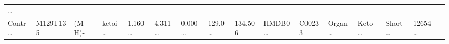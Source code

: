 \documentclass[
]{article}
\begin{document}
\begin{longtable}[]{@{}llllllllllllllll@{}}
\begin{minipage}[t]{0.02\columnwidth}
\ldots{}\strut
\end{minipage}\tabularnewline
\begin{minipage}[t]{0.04\columnwidth}\raggedright
Contr\ldots{}\strut
\end{minipage} & \begin{minipage}[t]{0.04\columnwidth}\raggedright
M129T135\strut
\end{minipage} & \begin{minipage}[t]{0.04\columnwidth}\raggedright
(M-H)-\strut
\end{minipage} & \begin{minipage}[t]{0.04\columnwidth}\raggedright
ketoi\ldots{}\strut
\end{minipage} & \begin{minipage}[t]{0.04\columnwidth}\raggedright
1.160\ldots{}\strut
\end{minipage} & \begin{minipage}[t]{0.04\columnwidth}\raggedright
4.311\ldots{}\strut
\end{minipage} & \begin{minipage}[t]{0.04\columnwidth}\raggedright
0.000\ldots{}\strut
\end{minipage} & \begin{minipage}[t]{0.04\columnwidth}\raggedright
129.0\ldots{}\strut
\end{minipage} & \begin{minipage}[t]{0.04\columnwidth}\raggedright
134.506\strut
\end{minipage} & \begin{minipage}[t]{0.04\columnwidth}\raggedright
HMDB0\ldots{}\strut
\end{minipage} & \begin{minipage}[t]{0.03\columnwidth}\raggedright
C00233\strut
\end{minipage} & \begin{minipage}[t]{0.04\columnwidth}\raggedright
Organ\ldots{}\strut
\end{minipage} & \begin{minipage}[t]{0.04\columnwidth}\raggedright
Keto \ldots{}\strut
\end{minipage} & \begin{minipage}[t]{0.04\columnwidth}\raggedright
Short\ldots{}\strut
\end{minipage} & \begin{minipage}[t]{0.04\columnwidth}\raggedright
12654\ldots{}\strut
\end{minipage} & \begin{minipage}[t]{0.02\columnwidth}\raggedright

\end{minipage}
\end{longtable}
\end{document}
